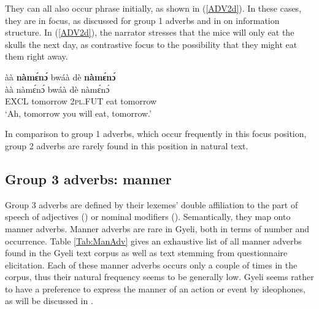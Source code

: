  
They can all also occur phrase initially, as shown in (\ref{ADV2d}). In these cases, they are in focus, as discussed for group 1 adverbs and in  on information structure. In (\ref{ADV2d}), the narrator stresses that the mice will only eat the skulls the next day, as contrastive focus to the possibility that they might eat them right away.


\begin{exe} 
\ex\label{ADV2d}
  \glll àà {\bfseries nàmɛ́nɔ́} bwáà dè {\bfseries nàmɛ́nɔ́} \\
       àà nàmɛ́nɔ́ bwáà dè nàmɛ́nɔ́ \\
       EXCL tomorrow 2\textsc{pl}.FUT eat tomorrow  \\
    \trans `Ah, tomorrow you will eat, tomorrow.'
\end{exe}

\noindent In comparison to group 1 adverbs, which occur frequently in this focus position, group 2 adverbs are rarely found in this position in natural text.








\subsection{Group 3 adverbs: manner} 
\label{sec:G3ADV}

Group 3 adverbs are defined by their lexemes' double affiliation to the part of speech of adjectives () or nominal modifiers (). Semantically, they map onto manner adverbs.
Manner adverbs are rare in Gyeli, both in terms of number and occurrence. Table \ref{Tab:ManAdv} gives an exhaustive list of all manner adverbs found in the Gyeli text corpus as well as text stemming from questionnaire elicitation. Each of these manner adverbs occurs only a couple of times in the corpus, thus their natural frequency seems to be generally low. Gyeli seems rather to have a preference to express the manner of an action or event by ideophones, as will be discussed in .

